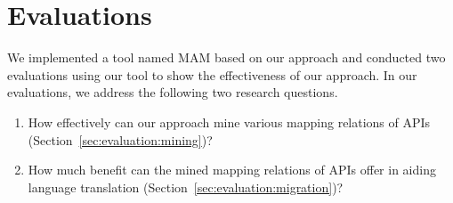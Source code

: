 \section{Evaluations}
\label{sec:evaluation}

We implemented a tool named MAM based on our approach and
conducted two evaluations using our tool to show the effectiveness
of our approach. In our evaluations, we address the following
two research questions.

\vspace*{-1.5ex}\begin{enumerate}
\item How effectively can our approach mine various mapping relations of APIs
(Section~\ref{sec:evaluation:mining})? \vspace*{-1.5ex}
\item How much benefit can the mined mapping relations of APIs offer in aiding language
translation (Section~\ref{sec:evaluation:migration})?\vspace*{-1.5ex}
\end{enumerate}%
